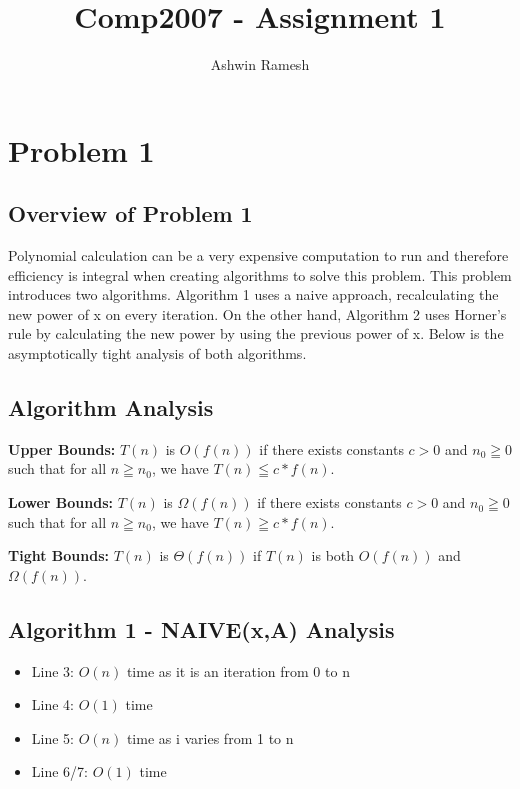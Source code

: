 \documentclass{article}
\author{Ashwin Ramesh}
\title{Comp2007 - Assignment 1}
\begin{document}
\maketitle

\section{Problem 1}

\subsection{Overview of Problem 1}

Polynomial calculation can be a very expensive computation to run and therefore efficiency is integral when creating algorithms to solve this problem. This problem introduces two algorithms. Algorithm 1 uses a naive approach, recalculating the new power of x on every iteration. On the other hand, Algorithm 2 uses Horner's rule by calculating the new power by using the previous power of x. Below is the asymptotically tight analysis of both algorithms. 

\subsection{Algorithm Analysis}


\begin{flushleft}

\textbf{Upper Bounds:} $T(n)$ is $O(f(n))$ if there exists constants $c > 0$ and $n_{0} \geqq 0$ such that for all $n \geqq n_{0}$, we have $T(n) \leqq c*f(n)$.
\end{flushleft}

\begin{flushleft}
\textbf{Lower Bounds:} $T(n)$ is $\Omega (f(n))$ if there exists constants $c > 0$ and $n_{0} \geqq 0$ such that for all $n \geqq n_{0}$, we have $T(n) \geqq c*f(n)$.
\end{flushleft}

\begin{flushleft}
\textbf{Tight Bounds:} $T(n)$ is $\Theta (f(n))$ if $ T(n) $ is both $O(f(n))$ and $\Omega (f(n))$.
\end{flushleft}

\subsection{Algorithm 1 - NAIVE(x,A) Analysis}
\begin{itemize}
\item Line 3: $O(n)$ time as it is an iteration from 0 to n

\item Line 4: $O(1)$ time

\item Line 5: $O(n)$ time as i varies from 1 to n

\item Line 6/7: $O(1)$ time
\end{itemize}
\end{document}
